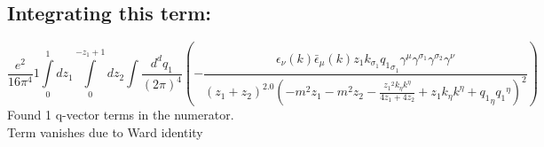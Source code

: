 \subsection*{Integrating this term:}
\begin{dmath}\frac{e^{2}}{16 \pi^{4}}1\int\limits_{ 0 }^{ 1 } d{ z_{ 1 } }\int\limits_{ 0 }^{ - { z_{ 1 } } + 1 } d{ z_{ 2 } }\int\frac{d^d q_1 }{ (2\pi)^4 }\left(- \frac{\epsilon_{ \nu }({ k }) \bar{\epsilon}_{ \mu }({ k }) { z_{ 1 } } { { k }_{ \sigma_1 } } { { q_1 }_{ \sigma_1 } } { \gamma^{ \mu } } { \gamma^{ \sigma_1 } } { \gamma^{ \sigma_2 } } { \gamma^{ \nu } }}{\left({ z_{ 1 } } + { z_{ 2 } }\right)^{2.0} \left(- m^{2} { z_{ 1 } } - m^{2} { z_{ 2 } } - \frac{{ z_{ 1 } }^{2} { { k }_{ \eta } } { { k }^{ \eta } }}{4 { z_{ 1 } } + 4 { z_{ 2 } }} + { z_{ 1 } } { { k }_{ \eta } } { { k }^{ \eta } } + { { q_1 }_{ \eta } } { { q_1 }^{ \eta } }\right)^{2}}\right)\end{dmath}
Found 1 q-vector terms in the numerator.\\
Term vanishes due to Ward identity\\
